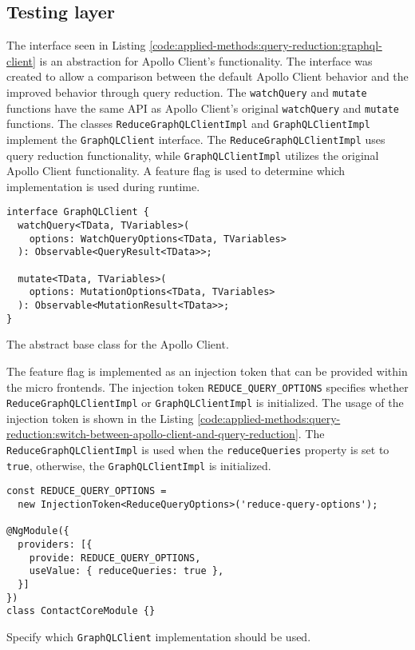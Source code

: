 \subsection{Testing layer}\label{subsection:applied-methods:query-reduction:testing-query-reduction}

The interface seen in Listing \ref{code:applied-methods:query-reduction:graphql-client} is an abstraction for Apollo Client's functionality. The interface was created to allow a comparison between the default Apollo Client behavior and the improved behavior through query reduction. The \texttt{watchQuery} and \texttt{mutate} functions have the same \ac{API} as Apollo Client's original \texttt{watchQuery} and \texttt{mutate} functions. The classes \texttt{ReduceGraphQLClientImpl} and \texttt{GraphQLClientImpl} implement the \texttt{GraphQLClient} interface. The \texttt{ReduceGraphQLClientImpl} uses query reduction functionality, while \texttt{GraphQLClientImpl} utilizes the original Apollo Client functionality. A feature flag is used to determine which implementation is used during runtime.

\ifshowListings
\begin{listing}[H]
\begin{verbatim}
interface GraphQLClient {
  watchQuery<TData, TVariables>(
    options: WatchQueryOptions<TData, TVariables>
  ): Observable<QueryResult<TData>>;

  mutate<TData, TVariables>(
    options: MutationOptions<TData, TVariables>
  ): Observable<MutationResult<TData>>;
}
\end{verbatim}
\caption{The abstract base class for the Apollo Client.}\label{code:applied-methods:query-reduction:graphql-client}
\end{listing}
\fi

\noindent The feature flag is implemented as an injection token that can be provided within the micro frontends. The injection token \texttt{REDUCE\_QUERY\_OPTIONS} specifies whether \texttt{ReduceGraphQLClientImpl} or \texttt{GraphQLClientImpl} is initialized. The usage of the injection token is shown in the Listing \ref{code:applied-methods:query-reduction:switch-between-apollo-client-and-query-reduction}. The \texttt{ReduceGraphQLClientImpl} is used when the \texttt{reduceQueries} property is set to \texttt{true}, otherwise, the \texttt{GraphQLClientImpl} is initialized.

\ifshowListings
\begin{listing}[H]
\begin{verbatim}
const REDUCE_QUERY_OPTIONS = 
  new InjectionToken<ReduceQueryOptions>('reduce-query-options');

@NgModule({
  providers: [{
    provide: REDUCE_QUERY_OPTIONS,
    useValue: { reduceQueries: true },
  }]
})
class ContactCoreModule {}
\end{verbatim}
\caption{Specify which \texttt{GraphQLClient} implementation should be used.}\label{code:applied-methods:query-reduction:switch-between-apollo-client-and-query-reduction}
\end{listing}
\fi

